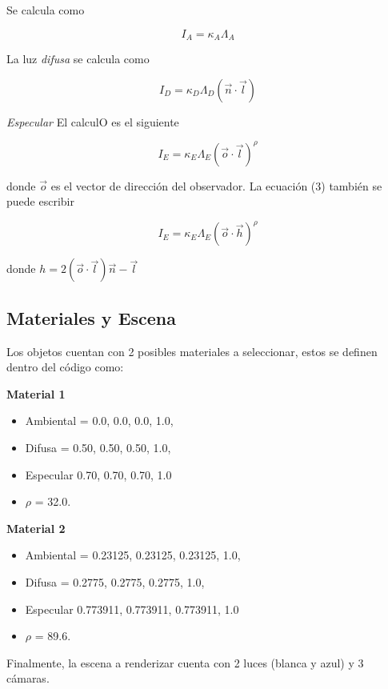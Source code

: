 \documentclass[12pt]{article}
\begin{document}
Se calcula como

\begin{equation}
I_{A}=\kappa_{A}\Lambda_{A}
\end{equation}

La luz \textit {difusa} se calcula como 

\begin{equation}
I_{D}=\kappa_{D}\Lambda_{D}(\vec{n} \cdot \vec{l})
\end{equation}

\textit{Especular}
El calculO es el siguiente

\begin{equation} \label{eq:3}
I_{E}=\kappa_{E}\Lambda_{E}(\vec{o} \cdot \vec{l})^{\rho}
\end{equation}

donde $\vec{o}$ es el vector de dirección del observador. La ecuación (3) también se puede escribir

\begin{equation}
I_{E}=\kappa_{E}\Lambda_{E}(\vec{o} \cdot \vec{h})^{\rho}
\end{equation}


donde $h=2(\vec{o} \cdot \vec{l})\vec{n}-\vec{l}$

\subsection{Materiales y Escena}
Los objetos cuentan con 2 posibles materiales a seleccionar, estos se definen dentro del código como:

\textbf{Material 1}
\begin{itemize}
\item Ambiental = {0.0, 0.0, 0.0, 1.0},
\item Difusa = {0.50, 0.50, 0.50, 1.0},
\item Especular {0.70, 0.70, 0.70, 1.0} 
\item $\rho$ = 32.0.
\end{itemize}


\textbf{Material 2}
\begin{itemize}
\item Ambiental = {0.23125, 0.23125, 0.23125, 1.0},
\item Difusa = {0.2775, 0.2775, 0.2775, 1.0},
\item Especular {0.773911, 0.773911, 0.773911, 1.0}
\item $\rho$ = 89.6.
\end{itemize}


Finalmente, la escena a renderizar cuenta con 2 luces (blanca y azul) y 3 cámaras.
\end{document}
